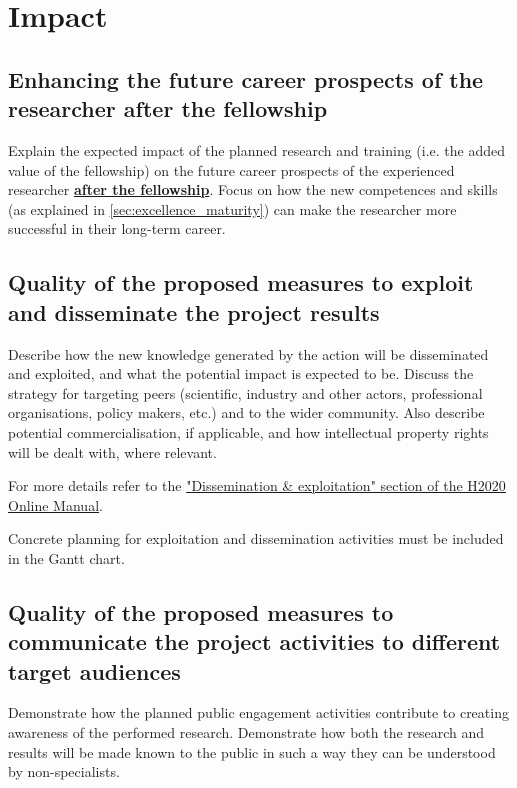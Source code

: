 \section{Impact}
\label{sec:impact}

\subsection{ Enhancing the future career prospects of the researcher after the fellowship}
\label{sec:impact_researcher}

Explain the expected impact of the planned research and training (i.e. the added value
of the fellowship) on the future career prospects of the experienced researcher \ul{\textbf{after
the fellowship}}. Focus on how the new competences and skills (as explained in \ref{sec:excellence_maturity})
can make the researcher more successful in their long-term career.


\subsection{Quality of the proposed measures to exploit and disseminate the project results}
\label{sec:impact_dissemination}

Describe how the new knowledge generated by the action will be disseminated and
exploited, and what the potential impact is expected to be. Discuss the strategy for
targeting peers (scientific, industry and other actors, professional organisations, policy
makers, etc.) and to the wider community. Also describe potential commercialisation,
if applicable, and how intellectual property rights will be dealt with, where relevant.

\medskip\noindent
For more details refer to the
\href{http://ec.europa.eu/research/participants/docs/h2020-funding-guide/grants/grant-management/dissemination-of-results_en.htm}
{"Dissemination \& exploitation" section of the H2020 Online Manual}.

\medskip\noindent
Concrete planning for exploitation and dissemination activities must be included in the
Gantt chart.


\subsection{Quality of the proposed measures to communicate the project activities to different target audiences}
\label{sec:impact_communication}

Demonstrate how the planned public engagement activities contribute to creating
awareness of the performed research. Demonstrate how both the research and results
will be made known to the public in such a way they can be understood by non-specialists.

